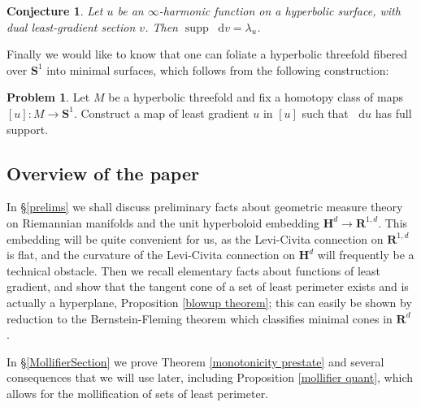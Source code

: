 \documentclass[reqno,10pt]{amsart}
\newcommand{\RR}{\mathbf{R}}
\newcommand{\Hyp}{\mathbf H}
\newcommand{\Sph}{\mathbf S}
\DeclareMathOperator{\supp}{supp}
\newcommand*\dif{\mathop{}\!\mathrm{d}}
\newtheorem{conjecture}[theorem]{Conjecture}
\theoremstyle{definition}
\newtheorem{problem}[theorem]{Problem}
\numberwithin{equation}{section}
\begin{document}
\begin{conjecture}\label{two laminations agree}
Let $u$ be an $\infty$-harmonic function on a hyperbolic surface, with dual least-gradient section $v$.
Then $\supp \dif v = \lambda_u$.
\end{conjecture}

Finally we would like to know that one can foliate a hyperbolic threefold fibered over $\Sph^1$ into minimal surfaces, which follows from the following construction:

\begin{problem}
Let $M$ be a hyperbolic threefold and fix a homotopy class of maps $[u]: M \to \Sph^1$.
Construct a map of least gradient $u$ in $[u]$ such that $\dif u$ has full support.
\end{problem}

\subsection{Overview of the paper}
In \S\ref{prelims} we shall discuss preliminary facts about geometric measure theory on Riemannian manifolds and the unit hyperboloid embedding $\Hyp^d \to \RR^{1, d}$.
This embedding will be quite convenient for us, as the Levi-Civita connection on $\RR^{1, d}$ is flat, and the curvature of the Levi-Civita connection on $\Hyp^d$ will frequently be a technical obstacle.
Then we recall elementary facts about functions of least gradient, and show that the tangent cone of a set of least perimeter exists and is actually a hyperplane, Proposition \ref{blowup theorem}; this can easily be shown by reduction to the Bernstein-Fleming theorem which classifies minimal cones in $\RR^d$ \cite[Theorem 17.3]{Giusti77}.

In \S\ref{MollifierSection} we prove Theorem \ref{monotonicity prestate} and several consequences that we will use later, including Proposition \ref{mollifier quant}, which allows for the mollification of sets of least perimeter.
\end{document}
